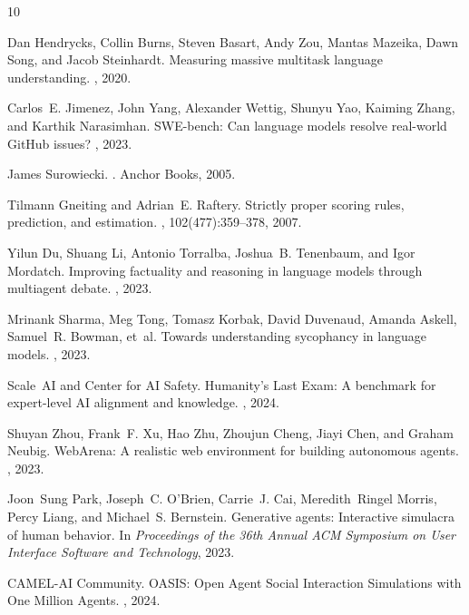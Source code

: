 \documentclass[11pt,journal,onecolumn]{IEEEtran}
\begin{document}

\begin{thebibliography}{10}

Dan Hendrycks, Collin Burns, Steven Basart, Andy Zou, Mantas Mazeika, Dawn Song, and Jacob Steinhardt.
\newblock Measuring massive multitask language understanding.
, 2020.

Carlos~E. Jimenez, John Yang, Alexander Wettig, Shunyu Yao, Kaiming Zhang, and Karthik Narasimhan.
\newblock SWE-bench: Can language models resolve real-world GitHub issues?
, 2023.

James Surowiecki.
.
\newblock Anchor Books, 2005.

Tilmann Gneiting and Adrian~E. Raftery.
\newblock Strictly proper scoring rules, prediction, and estimation.
, 102(477):359--378, 2007.

Yilun Du, Shuang Li, Antonio Torralba, Joshua~B. Tenenbaum, and Igor Mordatch.
\newblock Improving factuality and reasoning in language models through multiagent debate.
, 2023.

Mrinank Sharma, Meg Tong, Tomasz Korbak, David Duvenaud, Amanda Askell, Samuel~R. Bowman, et~al.
\newblock Towards understanding sycophancy in language models.
, 2023.

Scale~AI and Center for AI Safety.
\newblock Humanity's Last Exam: A benchmark for expert-level AI alignment and knowledge.
, 2024.

Shuyan Zhou, Frank~F. Xu, Hao Zhu, Zhoujun Cheng, Jiayi Chen, and Graham Neubig.
\newblock WebArena: A realistic web environment for building autonomous agents.
, 2023.

Joon~Sung Park, Joseph~C. O'Brien, Carrie~J. Cai, Meredith~Ringel Morris, Percy Liang, and Michael~S. Bernstein.
\newblock Generative agents: Interactive simulacra of human behavior.
\newblock In {\em Proceedings of the 36th Annual ACM Symposium on User Interface Software and Technology}, 2023.

CAMEL-AI Community.
\newblock OASIS: Open Agent Social Interaction Simulations with One Million Agents.
, 2024.


\end{thebibliography}
\end{document}
